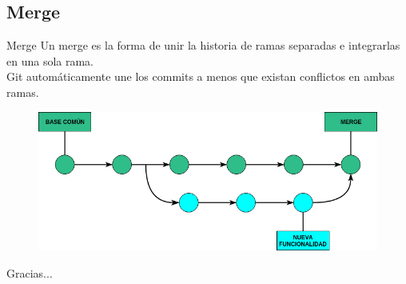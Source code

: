 \documentclass{beamer}
\begin{document}
\subsection{Merge}
\begin{frame}{Merge}
Un merge es la forma de unir la historia de ramas separadas e integrarlas en una sola rama. \\

Git automáticamente une los commits a menos que existan conflictos en ambas ramas.
 \begin{figure}
 \centering
 \includegraphics[scale=0.45]{Imagenes/merge}
 \end{figure}
\end{frame}

\begin{frame}
\centering
Gracias...
\end{frame}
\end{document}

